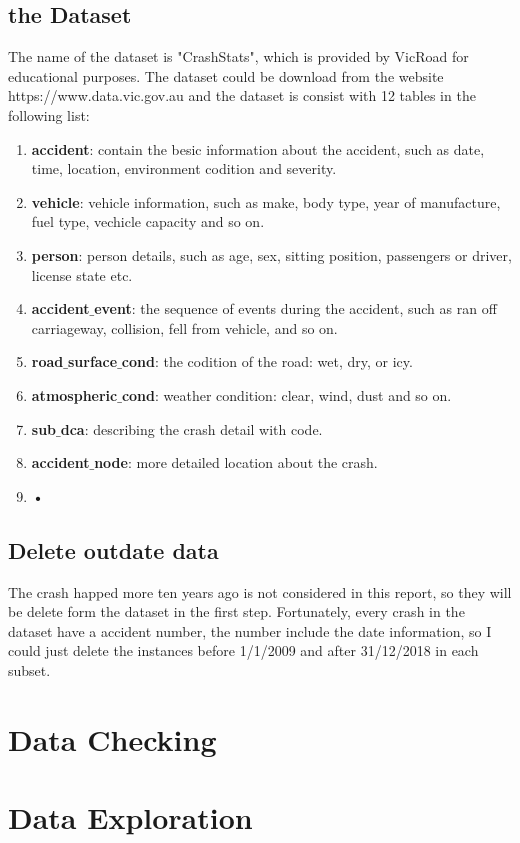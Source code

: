 \documentclass[11pt]{article}
\theoremstyle{definition}
\begin{document}
\subsection{the Dataset}
The name of the dataset is "CrashStats", which is provided by VicRoad for educational purposes. The dataset could be download from the website https://www.data.vic.gov.au and the dataset is consist with 12 tables in the following list:
\begin{enumerate}
	\item \textbf{accident}:	contain the besic information about the accident, such as date, time, location, environment codition and severity.
	\item \textbf{vehicle}:	vehicle information, such as make, body type, year of manufacture, fuel type, vechicle capacity and so on.
	\item \textbf{person}:	person details, such as age, sex, sitting position, passengers or driver, license state etc.	
	\item \textbf{accident$\_$event}: the sequence of events during the accident, such as ran off carriageway, collision, fell from vehicle, and so on.
	\item \textbf{road$\_$surface$\_$cond}:	the codition of the road: wet, dry, or icy.
	\item \textbf{atmospheric$\_$cond}:	weather condition: clear, wind, dust and so on.
	\item \textbf{sub$\_$dca}:	describing the crash detail with code.
	\item \textbf{accident$\_$node}:	more detailed location about the crash.
	\item \textbf{•}
\end{enumerate}
\subsection{Delete outdate data}
The crash happed more ten years ago is not considered in this report, so they will be delete form the dataset in the first step. Fortunately, every crash in the dataset have a accident number, the number include the date information, so I could just delete the instances before 1/1/2009 and after 31/12/2018 in each subset.  


\section{Data Checking}
\label{dataChecking}

\section{Data Exploration}
\label{dataExploration}
\end{document}
